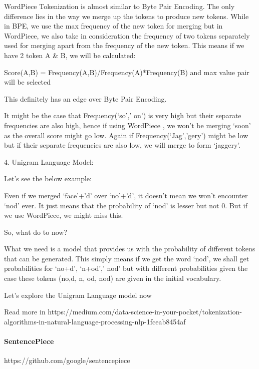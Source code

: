 WordPiece Tokenization is almost similar to Byte Pair Encoding. The only difference lies in the way we merge up the tokens to produce new tokens. While in BPE, we use the max frequency of the new token for merging but in WordPiece, we also take in consideration the frequency of two tokens separately used for merging apart from the frequency of the new token. This means if we have 2 token A \& B, we will be calculated:

Score(A,B) = Frequency(A,B)/Frequency(A)*Frequency(B) and max value pair will be selected

This definitely has an edge over Byte Pair Encoding.

It might be the case that Frequency(‘so’,’ on’) is very high but their separate frequencies are also high, hence if using WordPiece , we won’t be merging ‘soon’ as the overall score might go low. Again if Frequency(‘Jag’,’gery’) might be low but if their separate frequencies are also low, we will merge to form ‘jaggery’.

4. Unigram Language Model:

Let’s see the below example:

Even if we merged ‘face’+’d’ over ‘no’+’d’, it doesn’t mean we won’t encounter ‘nod’ ever. It just means that the probability of ‘nod’ is lesser but not 0. But if we use WordPiece, we might miss this.

So, what do to now?

What we need is a model that provides us with the probability of different tokens that can be generated. This simply means if we get the word ‘nod’, we shall get probabilities for ‘no+d’, ‘n+od’,’ nod’ but with different probabilities given the case these tokens (no,d, n, od, nod) are given in the initial vocabulary.

Let’s explore the Unigram Language model now

Read more in https://medium.com/data-science-in-your-pocket/tokenization-algorithms-in-natural-language-processing-nlp-1fceab8454af

\paragraph{SentencePiece}

https://github.com/google/sentencepiece

